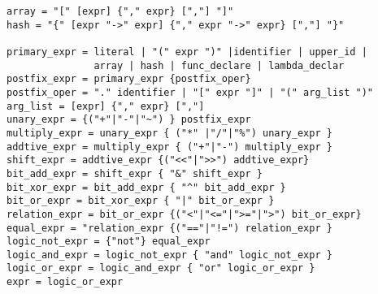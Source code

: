 \begin{verbatim}
array = "[" [expr] {"," expr} [","] "]"
hash = "{" [expr "->" expr] {"," expr "->" expr} [","] "}"

primary_expr = literal | "(" expr ")" |identifier | upper_id | 
               array | hash | func_declare | lambda_declar 
postfix_expr = primary_expr {postfix_oper}
postfix_oper = "." identifier | "[" expr "]" | "(" arg_list ")"
arg_list = [expr] {"," expr} [","]
unary_expr = {("+"|"-"|"~") } postfix_expr 
multiply_expr = unary_expr { ("*" |"/"|"%") unary_expr }
addtive_expr = multiply_expr { ("+"|"-") multiply_expr }
shift_expr = addtive_expr {("<<"|">>") addtive_expr} 
bit_add_expr = shift_expr { "&" shift_expr }
bit_xor_expr = bit_add_expr { "^" bit_add_expr }
bit_or_expr = bit_xor_expr { "|" bit_or_expr }
relation_expr = bit_or_expr {("<"|"<="|">="|">") bit_or_expr}
equal_expr = "relation_expr {("=="|"!=") relation_expr }
logic_not_expr = {"not"} equal_expr 
logic_and_expr = logic_not_expr { "and" logic_not_expr }
logic_or_expr = logic_and_expr { "or" logic_or_expr }
expr = logic_or_expr
\end{verbatim}
